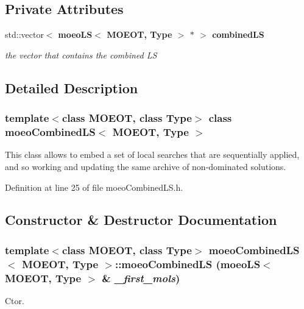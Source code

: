 \subsection*{Private Attributes}
\begin{CompactItemize}
\item 
std::vector$<$ \bf{moeo\-LS}$<$ MOEOT, Type $>$ $\ast$ $>$ \bf{combined\-LS}\label{classmoeoCombinedLS_3cf36ae7ada10d2837b60df01210d92a}

\begin{CompactList}\small\item\em the vector that contains the combined LS \item\end{CompactList}\end{CompactItemize}


\subsection{Detailed Description}
\subsubsection*{template$<$class MOEOT, class Type$>$ class moeo\-Combined\-LS$<$ MOEOT, Type $>$}

This class allows to embed a set of local searches that are sequentially applied, and so working and updating the same archive of non-dominated solutions. 



Definition at line 25 of file moeo\-Combined\-LS.h.

\subsection{Constructor \& Destructor Documentation}
\subsubsection{\setlength{\rightskip}{0pt plus 5cm}template$<$class MOEOT, class Type$>$ \bf{moeo\-Combined\-LS}$<$ MOEOT, Type $>$::\bf{moeo\-Combined\-LS} (\bf{moeo\-LS}$<$ MOEOT, Type $>$ \& {\em \_\-first\_\-mols})\hspace{0.3cm}{\tt  [inline]}}\label{classmoeoCombinedLS_5d09220b47bac67bd332dc0f93226ae1}


Ctor. 

